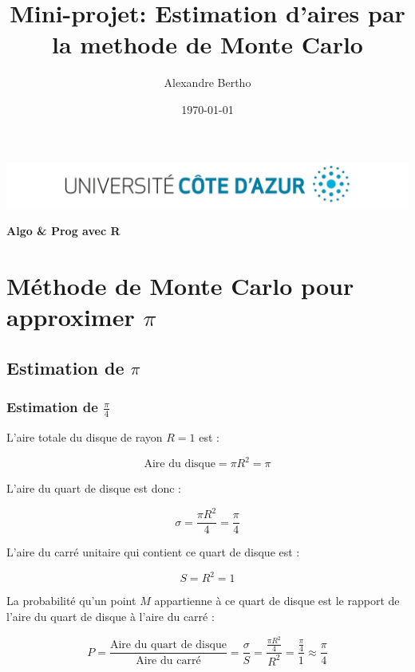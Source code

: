 \documentclass[a4paper,12pt]{article}
\title{Mini-projet: Estimation d'aires par la methode de Monte Carlo}
\author{Alexandre Bertho}
\date{\today}
\begin{document}
\begin{titlepage}
    \begin{center}
        \vspace*{1cm}
        \includegraphics[width=1\textwidth]{logo-univ.png}
        
        \textbf{\Large Algo \& Prog avec R}
        
        \vspace{0.5cm}
        \theauthor

        \vspace{1.5cm}
        \textbf{\Huge \thetitle}
        
        \vfill
        
        \large 
        \thedate
        
    \end{center}
\end{titlepage}

\section{Méthode de Monte Carlo pour approximer $\pi$}

\subsection{Estimation de $\pi$}

\subsubsection{Estimation de $\frac{\pi}{4}$}

L'aire totale du disque de rayon \( R = 1 \) est :

\[
\text{Aire du disque} = \pi R^2 = \pi
\]

L'aire du quart de disque est donc :

\[
\sigma = \frac{\pi R^2}{4} = \frac{\pi}{4}
\]

L'aire du carré unitaire qui contient ce quart de disque est :

\[
S = R^2 = 1
\]

La probabilité qu'un point \( M \) appartienne à ce quart de disque est le rapport de l'aire du quart de disque à l'aire du carré :

\[
P = \frac{\text{Aire du quart de disque}}{\text{Aire du carré}} = \frac{\sigma}{S} = \frac{\frac{\pi R^2}{4}}{R^2} = \frac{\frac{\pi}{4}}{1} \approx \frac{\pi}{4}
\]
\end{document}
